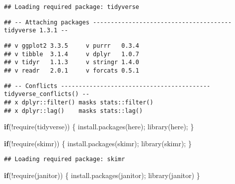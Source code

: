 \documentclass[
]{article}
\newenvironment{Shaded}{\begin{snugshade}}{\end{snugshade}}
\newcommand{\ControlFlowTok}[1]{\textcolor[rgb]{0.13,0.29,0.53}{\textbf{#1}}}
\newcommand{\FunctionTok}[1]{\textcolor[rgb]{0.00,0.00,0.00}{#1}}
\newcommand{\NormalTok}[1]{#1}
\newcommand{\SpecialCharTok}[1]{\textcolor[rgb]{0.00,0.00,0.00}{#1}}
\newcommand{\StringTok}[1]{\textcolor[rgb]{0.31,0.60,0.02}{#1}}
\begin{document}
\begin{verbatim}
## Loading required package: tidyverse
\end{verbatim}

\begin{verbatim}
## -- Attaching packages --------------------------------------- tidyverse 1.3.1 --
\end{verbatim}

\begin{verbatim}
## v ggplot2 3.3.5     v purrr   0.3.4
## v tibble  3.1.4     v dplyr   1.0.7
## v tidyr   1.1.3     v stringr 1.4.0
## v readr   2.0.1     v forcats 0.5.1
\end{verbatim}

\begin{verbatim}
## -- Conflicts ------------------------------------------ tidyverse_conflicts() --
## x dplyr::filter() masks stats::filter()
## x dplyr::lag()    masks stats::lag()
\end{verbatim}

\begin{Shaded}
\begin{Highlighting}[]
\ControlFlowTok{if}\NormalTok{(}\SpecialCharTok{!}\FunctionTok{require}\NormalTok{(}\StringTok{\textquotesingle{}tidyverse\textquotesingle{}}\NormalTok{))}
\NormalTok{\{}
  \FunctionTok{install.packages}\NormalTok{(}\StringTok{\textquotesingle{}here\textquotesingle{}}\NormalTok{);}
  \FunctionTok{library}\NormalTok{(here);}
\NormalTok{\}}
\end{Highlighting}
\end{Shaded}

\begin{Shaded}
\begin{Highlighting}[]
\ControlFlowTok{if}\NormalTok{(}\SpecialCharTok{!}\FunctionTok{require}\NormalTok{(}\StringTok{\textquotesingle{}skimr\textquotesingle{}}\NormalTok{))}
\NormalTok{\{}
  \FunctionTok{install.packages}\NormalTok{(}\StringTok{\textquotesingle{}skimr\textquotesingle{}}\NormalTok{);}
  \FunctionTok{library}\NormalTok{(skimr);}
\NormalTok{\}}
\end{Highlighting}
\end{Shaded}

\begin{verbatim}
## Loading required package: skimr
\end{verbatim}

\begin{Shaded}
\begin{Highlighting}[]
\ControlFlowTok{if}\NormalTok{(}\SpecialCharTok{!}\FunctionTok{require}\NormalTok{(}\StringTok{\textquotesingle{}janitor\textquotesingle{}}\NormalTok{))}
\NormalTok{\{}
  \FunctionTok{install.packages}\NormalTok{(}\StringTok{\textquotesingle{}janitor\textquotesingle{}}\NormalTok{);}
  \FunctionTok{library}\NormalTok{(janitor)}
\NormalTok{\} }
\end{Highlighting}
\end{Shaded}
\end{document}
